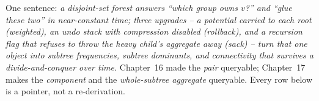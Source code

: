 

One sentence: \emph{a disjoint-set forest answers ``which group owns \(v\)?''
and ``glue these two'' in near-constant time; three upgrades -- a potential
carried to each root (weighted), an undo stack with compression disabled
(rollback), and a recursion flag that refuses to throw the heavy child's
aggregate away (sack) -- turn that one object into subtree frequencies,
subtree dominants, and connectivity that survives a divide-and-conquer over
time.} Chapter~16 made the \emph{pair} queryable; Chapter~17 makes the
\emph{component} and the \emph{whole-subtree aggregate} queryable. Every row
below is a pointer, not a re-derivation.

